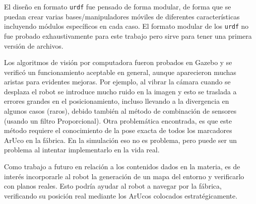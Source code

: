 \documentclass[12pt, a4paper]{report}
\begin{document}
		El diseño en formato \texttt{urdf} fue pensado de forma modular, de forma que se puedan crear varias bases/manipuladores móviles de diferentes características incluyendo módulos específicos en cada caso.
		El formato modular de los \texttt{urdf} no fue probado exhaustivamente para este trabajo pero sirve para tener una primera versión de archivos.

		Los algoritmos de visión por computadora fueron probados en Gazebo y se verificó un funcionamiento aceptable en general, aunque aparecieron muchas aristas para evidentes mejoras.
		Por ejemplo, al vibrar la cámara cuando se desplaza el robot se introduce mucho ruido en la imagen y esto se traslada a errores grandes en el posicionamiento, incluso llevando a la divergencia en algunos casos (raros), debido también al método de combinación de sensores (usando un filtro Proporcional).
		Otra problemática encontrada, es que este método requiere el conocimiento de la pose exacta de todos los marcadores ArUco en la fábrica.
		En la simulación eso no es problema, pero puede ser un problema al intentar implementarlo en la vida real.

		Como trabajo a futuro en relación a los contenidos dados en la materia, es de interés incorporarle al robot la generación de un mapa del entorno y verificarlo con planos reales.
		Esto podría ayudar al robot a navegar por la fábrica, verificando su posición real mediante los ArUcos colocados estratégicamente.


%
%		
\end{document}
